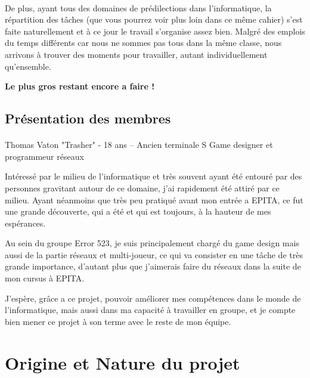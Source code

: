 \documentclass[12pt,a4paper]{article}
\begin{document}
\paragraph{}
De plus, ayant tous des domaines de prédilections dans l'informatique, la répartition des tâches (que vous pourrez voir plus loin dans ce même cahier) s'est faite naturellement et à ce jour le travail s'organise assez bien. Malgré des emplois du temps différents car nous ne sommes pas tous dans la même classe, nous arrivons à trouver des moments pour travailler, autant individuellement qu'ensemble.
\begin{center}
\textbf{Le plus gros restant encore a faire !}
\end{center}
\newpage
\subsection{Présentation des membres}
\paragraph{}
\begin{center}
Thomas Vaton "Trasher" - 18 ans – Ancien terminale S\newline
Game designer et programmeur réseaux
\end{center}

Intéressé par le milieu de l'informatique et très souvent ayant été entouré par des personnes gravitant autour de ce domaine, j'ai rapidement été attiré par ce milieu. Ayant néanmoins que très peu pratiqué avant mon entrée a EPITA, ce fut une grande découverte, qui a été et qui est toujours, à la hauteur de mes espérances.

Au sein du groupe Error 523, je suis principalement chargé du game design mais aussi de la partie réseaux et multi-joueur, ce qui va consister en une tâche de très grande importance, d'autant plus que j'aimerais faire du réseaux dans la suite de mon cursus à EPITA.

J'espère, grâce a ce projet, pouvoir améliorer mes compétences dans le monde de l'informatique, mais aussi dans ma capacité à travailler en groupe, et je compte bien mener ce projet à son terme avec le reste de mon équipe.

\newpage
\section{Origine et Nature du projet}
\end{document}
